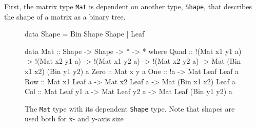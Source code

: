 \documentclass[a4paper,12pt,twosided]{report}
\begin{document}
First, the matrix type \texttt{Mat} is dependent on another type,
\texttt{Shape}, that describes the shape of a matrix as a binary tree.

\begin{figure}[H]
\begin{code}
data Shape = Bin Shape Shape | Leaf

data Mat :: Shape -> Shape -> * -> * where
  Quad :: !(Mat x1 y1 a) -> !(Mat x2 y1 a) ->
          !(Mat x1 y2 a) -> !(Mat x2 y2 a) ->
          Mat (Bin x1 x2) (Bin y1 y2) a
  Zero :: Mat x y a
  One :: !a -> Mat Leaf Leaf a
  Row :: Mat x1 Leaf a -> Mat x2 Leaf a -> Mat (Bin x1 x2) Leaf a
  Col :: Mat Leaf y1 a -> Mat Leaf y2 a -> Mat Leaf (Bin y1 y2) a
\end{code}
\caption{\label{mat}The \texttt{Mat} type with its dependent \texttt{Shape}
type. Note that shapes are used both for x- and y-axis size}
\end{figure}
\end{document}
